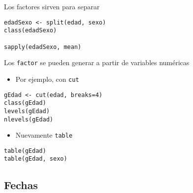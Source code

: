 \documentclass[xcolor={usenames,svgnames,dvipsnames}]{beamer}
\begin{document}
\begin{frame}[fragile,label=sec-5-1-4]{Los factores sirven para separar}
 \lstset{language=R,numbers=none}
\begin{lstlisting}
edadSexo <- split(edad, sexo)
class(edadSexo)

sapply(edadSexo, mean)
\end{lstlisting}
\end{frame}
\begin{frame}[fragile,label=sec-5-1-5]{Los \texttt{factor} se pueden generar a partir de variables numéricas}
 \begin{itemize}
\item Por ejemplo, con \texttt{cut}
\end{itemize}
\lstset{language=R,numbers=none}
\begin{lstlisting}
gEdad <- cut(edad, breaks=4)
class(gEdad)
levels(gEdad)
nlevels(gEdad)
\end{lstlisting}

\begin{itemize}
\item Nuevamente \texttt{table}
\end{itemize}
\lstset{language=R,numbers=none}
\begin{lstlisting}
table(gEdad)
table(gEdad, sexo)
\end{lstlisting}
\end{frame}
\subsection{Fechas}
\label{sec-5-2}
\end{document}
